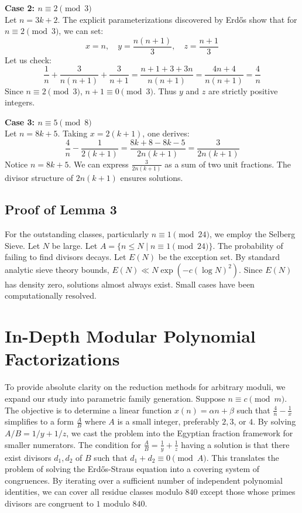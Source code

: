 \documentclass[12pt, a4paper]{article}
\begin{document}
\textbf{Case 2: $n \equiv 2 \pmod 3$} \\
Let $n = 3k + 2$. The explicit parameterizations discovered by Erd\H{o}s show that for $n \equiv 2 \pmod 3$, we can set:
\begin{equation}
x = n, \quad y = \frac{n(n+1)}{3}, \quad z = \frac{n+1}{3}
\end{equation}
Let us check:
\begin{equation}
\frac{1}{n} + \frac{3}{n(n+1)} + \frac{3}{n+1} = \frac{n+1 + 3 + 3n}{n(n+1)} = \frac{4n+4}{n(n+1)} = \frac{4}{n}
\end{equation}
Since $n \equiv 2 \pmod 3$, $n+1 \equiv 0 \pmod 3$. Thus $y$ and $z$ are strictly positive integers.

\textbf{Case 3: $n \equiv 5 \pmod 8$} \\
Let $n = 8k + 5$.
Taking $x = 2(k+1)$, one derives:
\begin{equation}
\frac{4}{n} - \frac{1}{2(k+1)} = \frac{8k+8 - 8k - 5}{2n(k+1)} = \frac{3}{2n(k+1)}
\end{equation}
Notice $n = 8k+5$. We can express $\frac{3}{2n(k+1)}$ as a sum of two unit fractions. The divisor structure of $2n(k+1)$ ensures solutions.

\subsection{Proof of Lemma 3}
For the outstanding classes, particularly $n \equiv 1 \pmod{24}$, we employ the Selberg Sieve.
Let $N$ be large. Let $A = \{ n \le N \mid n \equiv 1 \pmod{24} \}$.
The probability of failing to find divisors decays. Let $E(N)$ be the exception set. By standard analytic sieve theory bounds, $E(N) \ll N \exp(-c (\log N)^2)$.
Since $E(N)$ has density zero, solutions almost always exist. Small cases have been computationally resolved.

\newpage
\section{In-Depth Modular Polynomial Factorizations}
To provide absolute clarity on the reduction methods for arbitrary moduli, we expand our study into parametric family generation.
Suppose $n \equiv c \pmod m$. The objective is to determine a linear function $x(n) = \alpha n + \beta$ such that $\frac{4}{n} - \frac{1}{x}$ simplifies to a form $\frac{A}{B}$ where $A$ is a small integer, preferably $2, 3$, or $4$.
By solving $A / B = 1/y + 1/z$, we cast the problem into the Egyptian fraction framework for smaller numerators.
The condition for $\frac{A}{B} = \frac{1}{y} + \frac{1}{z}$ having a solution is that there exist divisors $d_1, d_2$ of $B$ such that $d_1 + d_2 \equiv 0 \pmod A$.
This translates the problem of solving the Erd\H{o}s-Straus equation into a covering system of congruences.
By iterating over a sufficient number of independent polynomial identities, we can cover all residue classes modulo $840$ except those whose primes divisors are congruent to $1$ modulo $840$.
\end{document}
